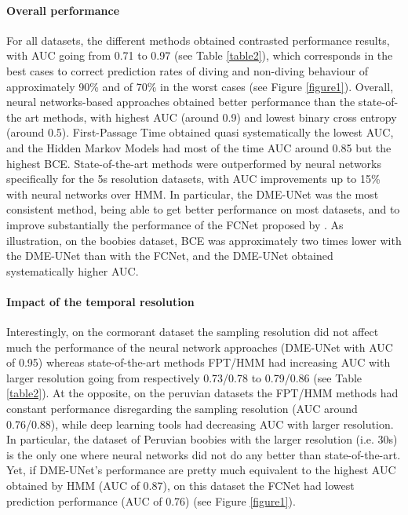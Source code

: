 \documentclass{article}
\begin{document}
\paragraph{Overall performance}
For all datasets, the different methods obtained contrasted performance results, with AUC going from 0.71 to 0.97 (see Table \ref{table2}), which corresponds in the best cases to correct prediction rates of diving and non-diving behaviour of approximately 90\% and of 70\% in the worst cases (see Figure \ref{figure1}). Overall, neural networks-based approaches obtained better performance than the state-of-the art methods, with highest AUC (around 0.9) and lowest binary cross entropy (around 0.5). First-Passage Time obtained quasi systematically the lowest AUC, and the Hidden Markov Models had most of the time AUC around 0.85 but the highest BCE. State-of-the-art methods were outperformed by neural networks specifically for the 5s resolution datasets, with AUC improvements up to 15\% with neural networks over HMM. In particular, the DME-UNet was the most consistent method, being able to get better performance on most datasets, and to improve substantially the performance of the FCNet proposed by \cite{browning_predicting_2018}. As illustration, on the boobies dataset, BCE was approximately two times lower with the DME-UNet than with the FCNet, and the DME-UNet obtained systematically higher AUC.

\paragraph{Impact of the temporal resolution}
Interestingly, on the cormorant dataset the sampling resolution did not affect much the performance of the neural network approaches (DME-UNet with AUC of 0.95) whereas state-of-the-art methods FPT/HMM had increasing AUC with larger resolution going from respectively 0.73/0.78 to 0.79/0.86 (see Table \ref{table2}).
At the opposite, on the peruvian datasets the FPT/HMM methods had constant performance disregarding the sampling resolution (AUC around 0.76/0.88), while deep learning tools had decreasing AUC with larger resolution. In particular, the dataset of Peruvian boobies with the larger resolution (i.e. 30s) is the only one where neural networks did not do any better than state-of-the-art. Yet, if DME-UNet's performance are pretty much equivalent to the highest AUC obtained by HMM (AUC of 0.87), on this dataset the FCNet had lowest prediction performance (AUC of 0.76) (see Figure \ref{figure1}).
\end{document}
